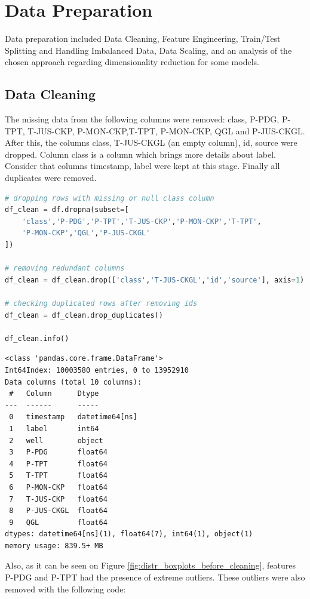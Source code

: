 \documentclass{article}
\begin{document}
\section{Data Preparation}

Data preparation included Data Cleaning, Feature Engineering, Train/Test Splitting and Handling Imbalanced Data, Data Scaling, and an analysis of the chosen approach regarding dimensionality reduction for some models.

\subsection{Data Cleaning}

The missing data from the following columns were removed: class, P-PDG, P-TPT, T-JUS-CKP, P-MON-CKP,T-TPT, P-MON-CKP, QGL and P-JUS-CKGL. After this, the columns class, T-JUS-CKGL (an empty column), id, source were dropped. Column class is a column which brings more details about label. Consider that columns timestamp, label were kept at this stage. Finally all duplicates were removed. 

\begin{lstlisting}[language=Python]
# dropping rows with missing or null class column
df_clean = df.dropna(subset=[
    'class','P-PDG','P-TPT','T-JUS-CKP','P-MON-CKP','T-TPT',
    'P-MON-CKP','QGL','P-JUS-CKGL'
])

# removing redundant columns
df_clean = df_clean.drop(['class','T-JUS-CKGL','id','source'], axis=1)

# checking duplicated rows after removing ids
df_clean = df_clean.drop_duplicates()

df_clean.info()
\end{lstlisting}

\begin{verbatim}
<class 'pandas.core.frame.DataFrame'>
Int64Index: 10003580 entries, 0 to 13952910
Data columns (total 10 columns):
 #   Column      Dtype         
---  ------      -----         
 0   timestamp   datetime64[ns]
 1   label       int64         
 2   well        object        
 3   P-PDG       float64       
 4   P-TPT       float64       
 5   T-TPT       float64       
 6   P-MON-CKP   float64       
 7   T-JUS-CKP   float64       
 8   P-JUS-CKGL  float64       
 9   QGL         float64       
dtypes: datetime64[ns](1), float64(7), int64(1), object(1)
memory usage: 839.5+ MB
\end{verbatim}

Also, as it can be seen on Figure \ref{fig:distr_boxplots_before_cleaning}, features P-PDG and P-TPT had the presence of extreme outliers. These outliers were also removed with the following code:
\end{document}
